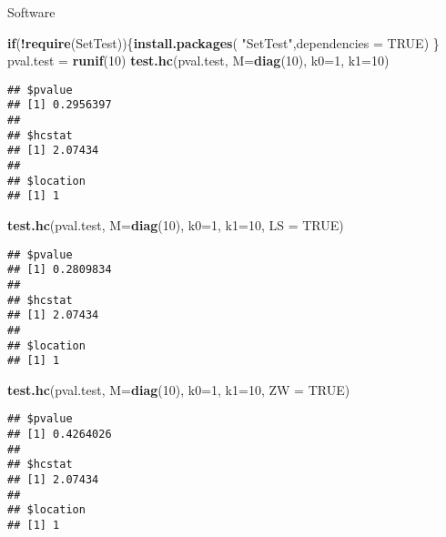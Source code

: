 \documentclass[
  11pt,
]{book}
\newenvironment{Shaded}{\begin{snugshade}}{\end{snugshade}}
\newcommand{\ControlFlowTok}[1]{\textcolor[rgb]{0.13,0.29,0.53}{\textbf{#1}}}
\newcommand{\DataTypeTok}[1]{\textcolor[rgb]{0.13,0.29,0.53}{#1}}
\newcommand{\DecValTok}[1]{\textcolor[rgb]{0.00,0.00,0.81}{#1}}
\newcommand{\KeywordTok}[1]{\textcolor[rgb]{0.13,0.29,0.53}{\textbf{#1}}}
\newcommand{\NormalTok}[1]{#1}
\newcommand{\OperatorTok}[1]{\textcolor[rgb]{0.81,0.36,0.00}{\textbf{#1}}}
\newcommand{\OtherTok}[1]{\textcolor[rgb]{0.56,0.35,0.01}{#1}}
\newcommand{\StringTok}[1]{\textcolor[rgb]{0.31,0.60,0.02}{#1}}
\begin{document}
Software

\begin{Shaded}
\begin{Highlighting}[]
\ControlFlowTok{if}\NormalTok{(}\OperatorTok{!}\KeywordTok{require}\NormalTok{(SetTest))\{}\KeywordTok{install.packages}\NormalTok{( }\StringTok{"SetTest"}\NormalTok{,}\DataTypeTok{dependencies =} \OtherTok{TRUE}\NormalTok{) \}}
\NormalTok{pval.test =}\StringTok{ }\KeywordTok{runif}\NormalTok{(}\DecValTok{10}\NormalTok{)}
\KeywordTok{test.hc}\NormalTok{(pval.test, }\DataTypeTok{M=}\KeywordTok{diag}\NormalTok{(}\DecValTok{10}\NormalTok{), }\DataTypeTok{k0=}\DecValTok{1}\NormalTok{, }\DataTypeTok{k1=}\DecValTok{10}\NormalTok{)}
\end{Highlighting}
\end{Shaded}

\begin{verbatim}
## $pvalue
## [1] 0.2956397
## 
## $hcstat
## [1] 2.07434
## 
## $location
## [1] 1
\end{verbatim}

\begin{Shaded}
\begin{Highlighting}[]
\KeywordTok{test.hc}\NormalTok{(pval.test, }\DataTypeTok{M=}\KeywordTok{diag}\NormalTok{(}\DecValTok{10}\NormalTok{), }\DataTypeTok{k0=}\DecValTok{1}\NormalTok{, }\DataTypeTok{k1=}\DecValTok{10}\NormalTok{, }\DataTypeTok{LS =} \OtherTok{TRUE}\NormalTok{)}
\end{Highlighting}
\end{Shaded}

\begin{verbatim}
## $pvalue
## [1] 0.2809834
## 
## $hcstat
## [1] 2.07434
## 
## $location
## [1] 1
\end{verbatim}

\begin{Shaded}
\begin{Highlighting}[]
\KeywordTok{test.hc}\NormalTok{(pval.test, }\DataTypeTok{M=}\KeywordTok{diag}\NormalTok{(}\DecValTok{10}\NormalTok{), }\DataTypeTok{k0=}\DecValTok{1}\NormalTok{, }\DataTypeTok{k1=}\DecValTok{10}\NormalTok{, }\DataTypeTok{ZW =} \OtherTok{TRUE}\NormalTok{)}
\end{Highlighting}
\end{Shaded}

\begin{verbatim}
## $pvalue
## [1] 0.4264026
## 
## $hcstat
## [1] 2.07434
## 
## $location
## [1] 1
\end{verbatim}
\end{document}
